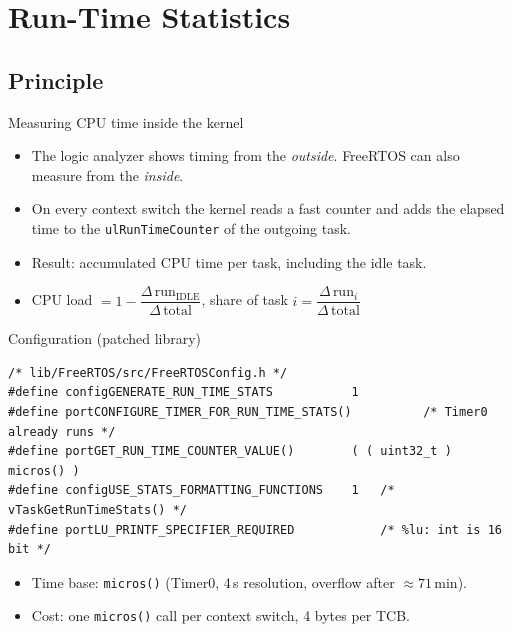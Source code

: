 \section{Run-Time Statistics}
\label{sec:runtimestats}

\subsection{Principle}
\begin{frame}{Measuring CPU time inside the kernel}
  \begin{itemize}
    \item The logic analyzer shows timing from the \emph{outside}. FreeRTOS can also measure from the \emph{inside}.
    \item On every context switch the kernel reads a fast counter and adds the elapsed time to the \texttt{ulRunTimeCounter} of the outgoing task.
    \item Result: accumulated CPU time per task, including the idle task.
    \item CPU load $= 1 - \dfrac{\Delta\,\text{run}_\text{IDLE}}{\Delta\,\text{total}}$, share of task $i = \dfrac{\Delta\,\text{run}_i}{\Delta\,\text{total}}$
  \end{itemize}
\end{frame}


\begin{frame}[fragile]{Configuration (patched library)}
\begin{lstlisting}
/* lib/FreeRTOS/src/FreeRTOSConfig.h */
#define configGENERATE_RUN_TIME_STATS           1
#define portCONFIGURE_TIMER_FOR_RUN_TIME_STATS()          /* Timer0 already runs */
#define portGET_RUN_TIME_COUNTER_VALUE()        ( ( uint32_t ) micros() )
#define configUSE_STATS_FORMATTING_FUNCTIONS    1   /* vTaskGetRunTimeStats() */
#define portLU_PRINTF_SPECIFIER_REQUIRED            /* %lu: int is 16 bit */
\end{lstlisting}
  \begin{itemize}
    \item Time base: \texttt{micros()} (Timer0, 4\,\textmu s resolution, overflow after $\approx 71$\,min).
    \item Cost: one \texttt{micros()} call per context switch, 4 bytes per TCB.
  \end{itemize}
\end{frame}


